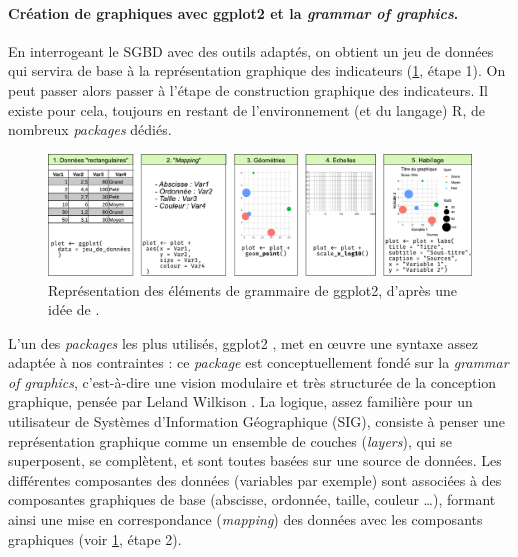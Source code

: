 \paragraph{Création de graphiques avec \textsf{ggplot2} et la \og \textit{grammar of graphics}\fg{}.}

En interrogeant le SGBD avec des outils adaptés, on obtient un jeu de données qui servira de base à la représentation graphique des indicateurs (\cref{fig:socviz-ggplot2}, étape 1).
On peut passer alors passer à l'étape de construction graphique des indicateurs.
Il existe pour cela, toujours en restant de l'environnement (et du langage) \textsf{R}, de nombreux \textit{packages} dédiés.

\begin{figure}[H]
	\centering
	\captionsetup{width=0.9\linewidth}
	\includegraphics[width=\linewidth]{img/grammar-graphics-steps.pdf}
	\caption[Les éléments de grammaire de \textsf{ggplot2}.]{Représentation des éléments de grammaire de \textsf{ggplot2}, d'après une idée de \textcite{healy_data_2018}.
	}
	\label{fig:socviz-ggplot2}
\end{figure}

L'un des \textit{packages} les plus utilisés, \textsf{ggplot2} \autocite{wickham_ggplot2_2016}, met en œuvre une syntaxe assez adaptée à nos contraintes : ce \textit{package} est conceptuellement fondé sur la \og \textit{grammar of graphics}\fg{}, c'est-à-dire une vision modulaire et très structurée de la conception graphique, pensée par Leland Wilkison \autocite{wilkinson_grammar_2006}.
La logique, assez familière pour un utilisateur de Systèmes d'Information Géographique (SIG), consiste à penser une représentation graphique comme un ensemble de couches (\textit{layers}), qui se superposent, se complètent, et sont toutes basées sur une source de données.
Les différentes composantes des données (variables par exemple) sont associées à des composantes graphiques de base (abscisse, ordonnée, taille, couleur \ldots), formant ainsi une mise en correspondance (\textit{mapping}) des données avec les composants graphiques (voir \cref{fig:socviz-ggplot2}, étape 2).

